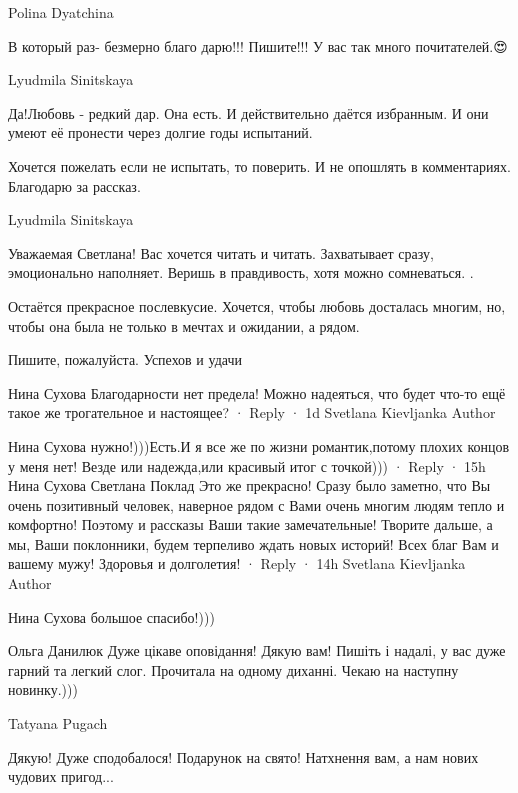 Polina Dyatchina

В который раз- безмерно благо дарю!!! Пишите!!! У вас так много почитателей.😍

Lyudmila Sinitskaya

Да!Любовь - редкий дар. Она есть. И действительно даётся избранным. И они умеют
её пронести через долгие годы испытаний.

Хочется пожелать если не испытать, то поверить. И не опошлять в комментариях.
Благодарю за рассказ.

Lyudmila Sinitskaya

Уважаемая Светлана! Вас хочется читать и читать. Захватывает сразу,
эмоционально наполняет. Веришь в правдивость, хотя можно сомневаться. .

Остаётся прекрасное послевкусие. Хочется, чтобы любовь досталась многим, но,
чтобы она была не только в мечтах и ожидании, а рядом.

Пишите, пожалуйста. Успехов и удачи

Нина Сухова
Благодарности нет предела! Можно надеяться, что будет что-то ещё такое же трогательное и настоящее?
 · Reply · 1d
Svetlana Kievljanka
Author

Нина Сухова нужно!)))Есть.И я все же по жизни романтик,потому плохих концов у меня нет! Везде или надежда,или красивый итог с точкой)))
 · Reply · 15h
Нина Сухова
Светлана Поклад Это же прекрасно! Сразу было заметно, что Вы очень позитивный человек, наверное рядом с Вами очень многим людям тепло и комфортно! Поэтому и рассказы Ваши такие замечательные! Творите дальше, а мы, Ваши поклонники, будем терпеливо ждать новых историй! Всех благ Вам и вашему мужу! Здоровья и долголетия!
 · Reply · 14h
Svetlana Kievljanka
Author

Нина Сухова большое спасибо!)))

Ольга Данилюк
Дуже цікаве оповідання! Дякую вам! Пишіть і надалі, у вас дуже гарний та легкий слог. Прочитала на одному диханні. Чекаю на наступну новинку.)))

Tatyana Pugach

Дякую! Дуже сподобалося!
Подарунок на свято!
Натхнення вам, а нам нових чудових пригод...
